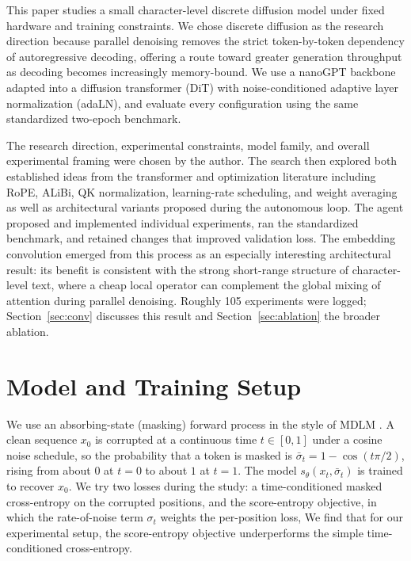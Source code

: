 \documentclass[11pt]{article}
\begin{document}
This paper studies a small character-level discrete diffusion model under fixed
hardware and training constraints. We chose discrete diffusion as the research
direction because parallel denoising removes the strict token-by-token dependency
of autoregressive decoding, offering a route toward greater generation throughput
as decoding becomes increasingly memory-bound. We use a nanoGPT
\citep{karpathy2022nanogpt} backbone adapted into a diffusion transformer (DiT)
\citep{peebles2023dit} with noise-conditioned adaptive layer normalization
(adaLN), and evaluate every configuration using the same standardized two-epoch
benchmark.

The research direction, experimental constraints, model family, and overall
experimental framing were chosen by the author. The search then explored both
established ideas from the transformer and optimization literature including
RoPE, ALiBi, QK normalization, learning-rate scheduling, and weight
averaging as well as architectural variants proposed during the autonomous loop.
The agent proposed and implemented individual experiments, ran the standardized
benchmark, and retained changes that improved validation loss. The embedding
convolution emerged from this process as an especially interesting architectural
result: its benefit is consistent with the strong short-range structure of
character-level text, where a cheap local operator can complement the global
mixing of attention during parallel denoising. Roughly 105 experiments were
logged; Section~\ref{sec:conv} discusses this result and
Section~\ref{sec:ablation} the broader ablation.

\section{Model and Training Setup}
\label{sec:method}

We use an absorbing-state (masking) forward process in the style of MDLM
\citep{sahoo2024mdlm}. A clean sequence $x_0$ is corrupted at a continuous time
$t\in[0,1]$ under a cosine noise schedule, so the probability that a token is
masked is $\bar\sigma_t = 1-\cos(t\pi/2)$, rising from about $0$ at $t{=}0$ to
about $1$ at $t{=}1$. The model $s_\theta(x_t,\bar\sigma_t)$ is trained to
recover $x_0$. We try two losses during the study: a time-conditioned masked
cross-entropy on the corrupted positions, and the score-entropy objective\cite{lou2024sedd}, in
which the rate-of-noise term $\sigma_t$ weights the per-position loss,
We find that for our experimental setup, the score-entropy objective underperforms
the simple time-conditioned cross-entropy.
\end{document}
